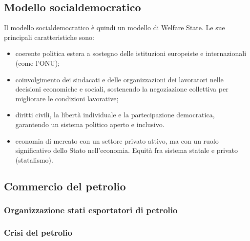 \documentclass[a4paper]{article}
\begin{document}
\subsection{Modello socialdemocratico}



Il modello socialdemocratico è quindi un modello di Welfare State.
Le sue principali caratteristiche sono:
\begin{itemize}
    \item coerente politica estera a sostegno delle istituzioni europeiste e internazionali (come l'ONU);
    \item coinvolgimento dei sindacati e delle organizzazioni dei lavoratori nelle decisioni economiche e sociali, sostenendo la negoziazione collettiva per migliorare le condizioni lavorative;
    \item diritti civili, la libertà individuale e la partecipazione democratica, garantendo un sistema politico aperto e inclusivo.
    \item economia di mercato con un settore privato attivo, ma con un ruolo significativo dello Stato nell'economia.
        Equità fra sistema statale e privato (statalismo).
\end{itemize}

\subsection{Commercio del petrolio}

\subsubsection{Organizzazione stati esportatori di petrolio}

\subsubsection{Crisi del petrolio}

\end{document}
